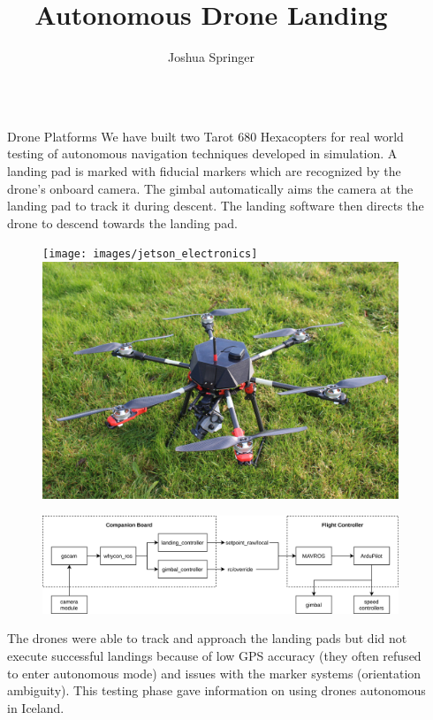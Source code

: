 \documentclass[final, 20pt]{beamer}
\title{Autonomous Drone Landing}
\author{Joshua Springer}
\institute[shortinst]{Reykjavík University}
\newlength{\sepwidth}
\newlength{\colwidth}
\newcommand{\separatorcolumn}{\begin{column}{\sepwidth}\end{column}}
\begin{document}
\begin{frame}[t]
\begin{columns}[t]
\separatorcolumn

\begin{column}{\colwidth}

  \begin{alertblock}{Drone Platforms}
    We have built two Tarot 680 Hexacopters for real world testing of autonomous navigation techniques developed in simulation.
    A landing pad is marked with fiducial markers which are recognized by the drone's onboard camera.
    The gimbal automatically aims the camera at the landing pad to track it during descent.
    The landing software then directs the drone to descend towards the landing pad.

    \begin{figure}
      \texttt{[image: images/jetson\_electronics]}
      \includegraphics[width=0.45\linewidth]{images/jetson_drone.jpg}
    \end{figure}

    \begin{figure}
      \includegraphics[width=\linewidth]{images/data_flow_opaque}
    \end{figure}

    The drones were able to track and approach the landing pads but did not execute successful landings because of low GPS accuracy
    (they often refused to enter autonomous mode) and issues with the marker systems (orientation ambiguity).
    This testing phase gave information on using drones autonomous in Iceland.

  \end{alertblock}


\end{column}
\end{columns}
\end{frame}
\end{document}
